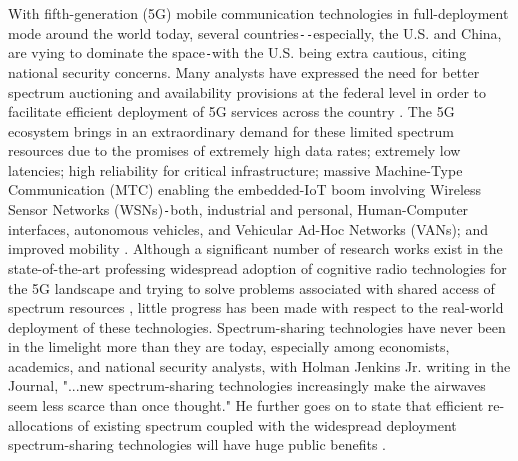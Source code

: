 \documentclass[12pt, draftcls, onecolumn]{IEEEtran}
\begin{document}
With fifth-generation (5G) mobile communication technologies in full-deployment mode around the world today, several countries\texttt{-{}-}especially, the U.S. and China, are vying to dominate the space\texttt{-}with the U.S. being extra cautious, citing national security concerns. Many analysts have expressed the need for better spectrum auctioning and availability provisions at the federal level in order to facilitate efficient deployment of 5G services across the country \cite{WSJ:5Gdominance}. The 5G ecosystem brings in an extraordinary demand for these limited spectrum resources due to the promises of extremely high data rates; extremely low latencies; high reliability for critical infrastructure; massive Machine-Type Communication (MTC) enabling the embedded-IoT boom involving Wireless Sensor Networks (WSNs)\texttt{-}both, industrial and personal, Human-Computer interfaces, autonomous vehicles, and Vehicular Ad-Hoc Networks (VANs); and improved mobility \cite{WCL:1,Ericsson:5Gusecases}. Although a significant number of research works exist in the state-of-the-art professing widespread adoption of cognitive radio technologies for the 5G landscape and trying to solve problems associated with shared access of spectrum resources \cite{WCL:7,WCL:6,WCL:4,WCL:5,WCL:9,WCL:10,WCL:11}, little progress has been made with respect to the real-world deployment of these technologies. Spectrum-sharing technologies have never been in the limelight more than they are today, especially among economists, academics, and national security analysts, with Holman Jenkins Jr. writing in the Journal, "...new spectrum-sharing technologies increasingly make the airwaves seem less scarce than once thought." He further goes on to state that efficient re-allocations of existing spectrum coupled with the widespread deployment spectrum-sharing technologies will have huge public benefits \cite{WSJ:HolmanJenkinsJr.}.
\end{document}

